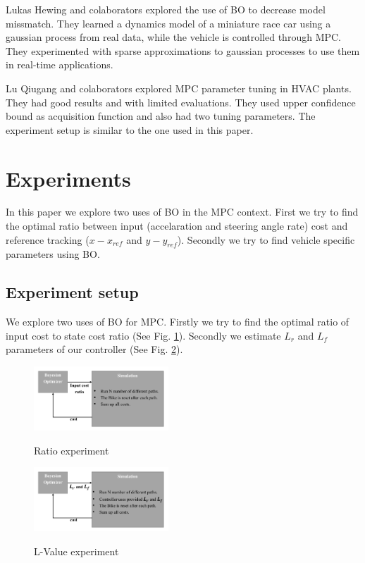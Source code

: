 \documentclass[twoside,twocolumn]{article}
\begin{document}
Lukas Hewing and colaborators \cite{hewing2018cautious} explored the use of BO to decrease model missmatch. They learned a dynamics model of a miniature race car using a gaussian process from real data, while the vehicle is controlled through MPC. They experimented with sparse approximations to gaussian processes to use them in real-time applications.

Lu Qiugang and colaborators \cite{lu2020mpc} explored MPC parameter tuning in HVAC plants. They had good results and with limited evaluations. They used upper confidence bound as acquisition function and also had two tuning parameters. The experiment setup is similar to the one used in this paper.


\section{Experiments}

In this paper we explore two uses of BO in the MPC context. First we try to find the optimal ratio between input (accelaration and steering angle rate) cost and reference tracking ($x - x_{ref}$ and $y - y_{ref}$). Secondly we try to find vehicle specific parameters using BO.

\subsection{Experiment setup}

We explore two uses of BO for MPC. Firstly we try to find the optimal ratio of input cost to state cost ratio (See Fig. \ref{fig:ratio_experiment}). Secondly we estimate $L_r$ and $L_f$ parameters of our controller (See Fig. \ref{fig:l_value_experiment}).

\begin{figure}[h]
    \caption{Ratio experiment}
    \centering
    \includegraphics[width=0.45\textwidth]{fig_ratio_experiment.pdf}
    \label{fig:ratio_experiment}
\end{figure}

\begin{figure}[h]
    \caption{L-Value experiment}
    \centering
    \includegraphics[width=0.45\textwidth]{fig_l_value_experiment.pdf}
    \label{fig:l_value_experiment}
\end{figure}
\end{document}
